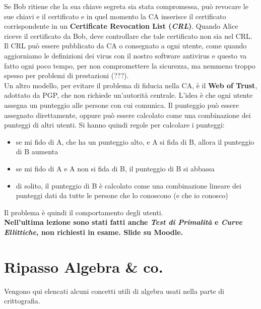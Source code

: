 \documentclass[a4paper,12pt, oneside]{book}
\begin{document}
Se Bob ritiene che la sua chiave segreta sia stata compromessa, può revocare le
sue chiavi e il certificato e in quel momento la CA inserisce il certificato
corrispondente in un \textbf{Certificate Revocation List (\textit{CRL})}. Quando
Alice riceve il certificato da Bob, deve controllare che tale certificato non
sia nel CRL. Il CRL può essere pubblicato da CA o consegnato a ogni utente, come
quando aggiorniamo le definizioni dei virus con il nostro software antivirus e
questo va fatto ogni poco tempo, per non compromettere la sicurezza, ma nemmeno
troppo spesso per problemi di prestazioni (???).\\
Un altro modello, per evitare il problema di fiducia nella CA, è il \textbf{Web
  of Trust}, adottato da PGP, che non richiede un'autorità centrale. L'idea è
che ogni utente assegna un punteggio alle persone con cui comunica. Il punteggio
può essere assegnato direttamente, oppure può essere calcolato come una
combinazione dei punteggi di altri utenti. Si hanno quindi regole per calcolare
i punteggi:
\begin{itemize}
  \item se mi fido di A, che ha un punteggio alto, e A si fida di B, allora il
  punteggio di B aumenta  
  \item se mi fido di A e A non si fida di B, il punteggio di B si abbassa 
  \item di solito, il punteggio di B è calcolato come una combinazione lineare
  dei punteggi dati da tutte le persone che lo conoscono (e che io conosco)  
\end{itemize}
Il problema è quindi il comportamento degli utenti.\\
\textbf{Nell'ultima lezione sono stati fatti anche \textit{Test di Primalità} e
  \textit{Curve Ellittiche},
  non richiesti in esame. Slide su Moodle.}
\chapter{Ripasso Algebra \& co.}
Vengono qui elencati alcuni concetti utili di algebra usati nella parte di
crittografia.
\end{document}
